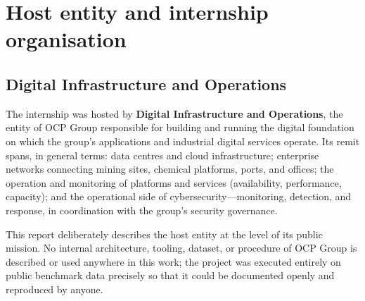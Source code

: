 \documentclass[11pt,a4paper]{report}
\begin{document}
\chapter{Host entity and internship organisation}
\label{ch:department}

\section{Digital Infrastructure and Operations}
The internship was hosted by \textbf{Digital Infrastructure and Operations},
the entity of OCP Group responsible for building and running the digital
foundation on which the group's applications and industrial digital services
operate. Its remit spans, in general terms: data centres and cloud
infrastructure; enterprise networks connecting mining sites, chemical
platforms, ports, and offices; the operation and monitoring of platforms and
services (availability, performance, capacity); and the operational side of
cybersecurity---monitoring, detection, and response, in coordination with the
group's security governance.

\begin{remark}[Confidentiality]
This report deliberately describes the host entity at the level of its
public mission. No internal architecture, tooling, dataset, or procedure of
OCP Group is described or used anywhere in this work; the project was
executed entirely on public benchmark data precisely so that it could be
documented openly and reproduced by anyone.
\end{remark}
\end{document}
